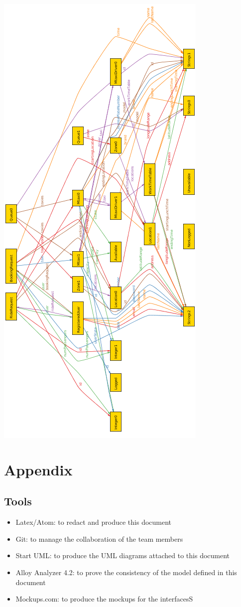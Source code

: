 \documentclass[11pt,titlepage]{article} %
\begin{document}
		\begin{center}
		\includegraphics[scale=0.62]{pred2.png}
		\end{center}

	\section{Appendix}
	\subsection{Tools}
		\begin{itemize}
			\item Latex/Atom: to redact and produce this document
			\item Git: to manage the collaboration of the team members
			\item Start UML: to produce the UML diagrams attached to this document
			\item Alloy Analyzer 4.2: to prove the consistency of the model defined in this document
			\item Mockups.com: to produce the mockups for the interfacesS
		\end{itemize}
\end{document}
